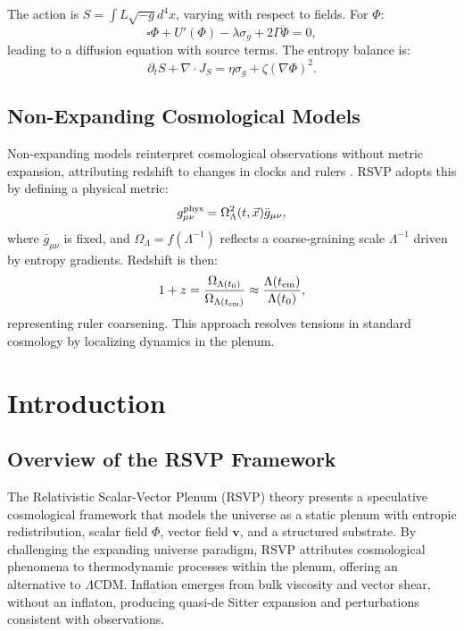 \documentclass[12pt, a4paper, openany]{book}
\theoremstyle{definition}
\begin{document}
The action is $S = \int L \sqrt{-g} d^4x$, varying with respect to fields. For $\Phi$:
\begin{equation}
\square \Phi + U'(\Phi) - \lambda \sigma_g + 2 \Gamma \ddot{\Phi} = 0,
\end{equation}
leading to a diffusion equation with source terms. The entropy balance is:
\begin{equation}
\partial_t S + \nabla \cdot J_S = \eta \sigma_g + \zeta (\nabla \Phi)^2.
\end{equation}

\section{Non-Expanding Cosmological Models}
Non-expanding models reinterpret cosmological observations without metric expansion, attributing redshift to changes in clocks and rulers \citep{Wiltshire:2007}. RSVP adopts this by defining a physical metric:
\begin{equation}
g_{\mu\nu}^{\rm phys} = \Omega_\Lambda^2(t,\vec{x}) \bar{g}_{\mu\nu},
\end{equation}
where $\bar{g}_{\mu\nu}$ is fixed, and $\Omega_\Lambda = f(\Lambda^{-1})$ reflects a coarse-graining scale $\Lambda^{-1}$ driven by entropy gradients. Redshift is then:
\begin{equation}
1 + z = \frac{\Omega_{\Lambda(t_0)}}{\Omega_{\Lambda(t_{\rm em})}} \approx \frac{\Lambda(t_{\rm em})}{\Lambda(t_0)},
\end{equation}
representing ruler coarsening. This approach resolves tensions in standard cosmology by localizing dynamics in the plenum.

\chapter{Introduction}
\section{Overview of the RSVP Framework}
The Relativistic Scalar-Vector Plenum (RSVP) theory presents a speculative cosmological framework that models the universe as a static plenum with entropic redistribution, scalar field $\Phi$, vector field $\mathbf{v}$, and a structured substrate. By challenging the expanding universe paradigm, RSVP attributes cosmological phenomena to thermodynamic processes within the plenum, offering an alternative to $\Lambda$CDM. Inflation emerges from bulk viscosity and vector shear, without an inflaton, producing quasi-de Sitter expansion and perturbations consistent with observations.
\end{document}
